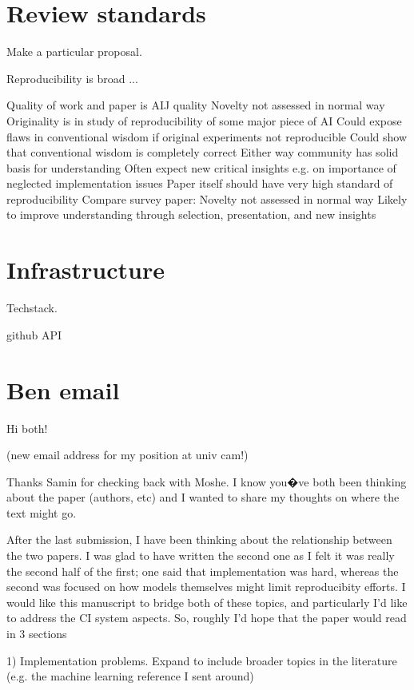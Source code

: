 \documentclass{article}
\begin{document}
\section{ Review standards }

Make a particular proposal. 

Reproducibility is broad ... 


Quality of work and paper is AIJ quality
Novelty not assessed in normal way
Originality is in study of reproducibility of some major piece of AI
Could expose flaws in conventional wisdom if original experiments not reproducible
Could show that conventional wisdom is completely correct 
Either way community has solid basis for understanding 
Often expect new critical insights e.g. on importance of neglected implementation issues
Paper itself should have very high standard of reproducibility
Compare survey paper:
Novelty not assessed in normal way
Likely to improve understanding through selection, presentation, and new insights



\section{Infrastructure}

Techstack. 

github API 

\section{Ben email}
Hi both! 

(new email address for my position at univ cam!)
 
Thanks Samin for checking back with Moshe. I know you�ve both been
thinking about the paper (authors, etc) and I wanted to share my
thoughts on where the text might go.
 
After the last submission, I have been thinking about the relationship
between the two papers. I was glad to have written the second one as I
felt it was really the second half of the first; one said that
implementation was hard, whereas the second was focused on how models
themselves might limit reproducibity efforts. I would like this
manuscript to bridge both of these topics, and particularly I'd like
to address the CI system aspects. So, roughly I'd hope that the paper
would read in 3 sections

 

1) Implementation problems. Expand to include broader topics in the
literature (e.g. the machine learning reference I sent around)
\end{document}
